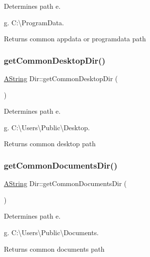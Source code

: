 Determines path e. 

g. C\+:\textbackslash{}\+Program\+Data. \begin{DoxyReturn}{Returns}
common appdata or programdata path 
\end{DoxyReturn}
\mbox{\label{class_dir_a9536e7d442b78a5cb63e6c363f2aa73e}} 
\subsubsection{\texorpdfstring{getCommonDesktopDir()}{getCommonDesktopDir()}}
{\footnotesize\ttfamily \mbox{\hyperlink{class_a_string}{A\+String}} Dir\+::get\+Common\+Desktop\+Dir (\begin{DoxyParamCaption}{ }\end{DoxyParamCaption})\hspace{0.3cm}{\ttfamily [static]}}



Determines path e. 

g. C\+:\textbackslash{}\+Users\textbackslash{}\+Public\textbackslash{}\+Desktop. \begin{DoxyReturn}{Returns}
common desktop path 
\end{DoxyReturn}
\mbox{\label{class_dir_a90740eddc387b59ac763d37ba3f6cc41}} 
\subsubsection{\texorpdfstring{getCommonDocumentsDir()}{getCommonDocumentsDir()}}
{\footnotesize\ttfamily \mbox{\hyperlink{class_a_string}{A\+String}} Dir\+::get\+Common\+Documents\+Dir (\begin{DoxyParamCaption}{ }\end{DoxyParamCaption})\hspace{0.3cm}{\ttfamily [static]}}



Determines path e. 

g. C\+:\textbackslash{}\+Users\textbackslash{}\+Public\textbackslash{}\+Documents. \begin{DoxyReturn}{Returns}
common documents path 
\end{DoxyReturn}
\mbox{\label{class_dir_adc99ead17e0a88b4c025ede986501181}} 
